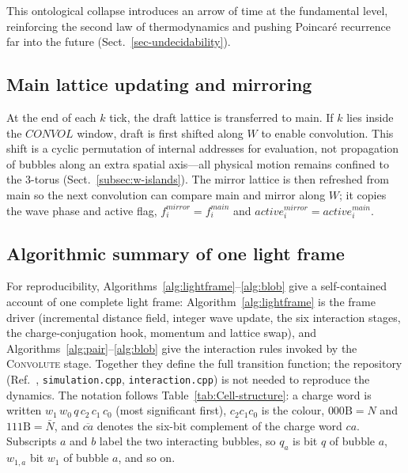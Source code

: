 \documentclass{ijuc}
\begin{document}
This ontological collapse introduces an arrow of time at the fundamental level, reinforcing the second law of thermodynamics and pushing Poincaré recurrence far into the future (Sect.~\ref{sec-undecidability}).

\subsection{Main lattice updating and mirroring} \label{subsec:updating}
At the end of each $k$ tick, the draft lattice is transferred to main. If $k$ lies inside the $CONVOL$ window, draft is first shifted along $W$ to enable convolution. This shift is a cyclic permutation of internal addresses for evaluation, not propagation of bubbles along an extra spatial axis---all physical motion remains confined to the 3-torus (Sect.~\ref{subsec:w-islands}). The mirror lattice is then refreshed from main so the next convolution can compare main and mirror along $W$; it copies the wave phase and active flag, $f_i^{mirror}=f_i^{main}$ and $\mathit{active}_i^{mirror}=\mathit{active}_i^{main}$.

\subsection{Algorithmic summary of one light frame}\label{subsec:algorithm}

For reproducibility, Algorithms~\ref{alg:lightframe}--\ref{alg:blob} give a self-contained account of one complete light frame: Algorithm~\ref{alg:lightframe} is the frame driver (incremental distance field, integer wave update, the six interaction stages, the charge-conjugation hook, momentum and lattice swap), and Algorithms~\ref{alg:pair}--\ref{alg:blob} give the interaction rules invoked by the \textsc{Convolute} stage.  Together they define the full transition function; the repository (Ref.~\cite{af_neto}, \texttt{simulation.cpp}, \texttt{interaction.cpp}) is not needed to reproduce the dynamics.  The notation follows Table~\ref{tab:Cell-structure}: a charge word is written $w_{1}\,w_{0}\,q\,c_{2}\,c_{1}\,c_{0}$ (most significant first), $c_{2}c_{1}c_{0}$ is the colour, $000\mathrm{B}=N$ and $111\mathrm{B}=\bar{N}$, and $\overline{ca}$ denotes the six-bit complement of the charge word $ca$.  Subscripts $a$ and $b$ label the two interacting bubbles, so $q_a$ is bit $q$ of bubble $a$, $w_{1,a}$ bit $w_{1}$ of bubble $a$, and so on.
\end{document}
